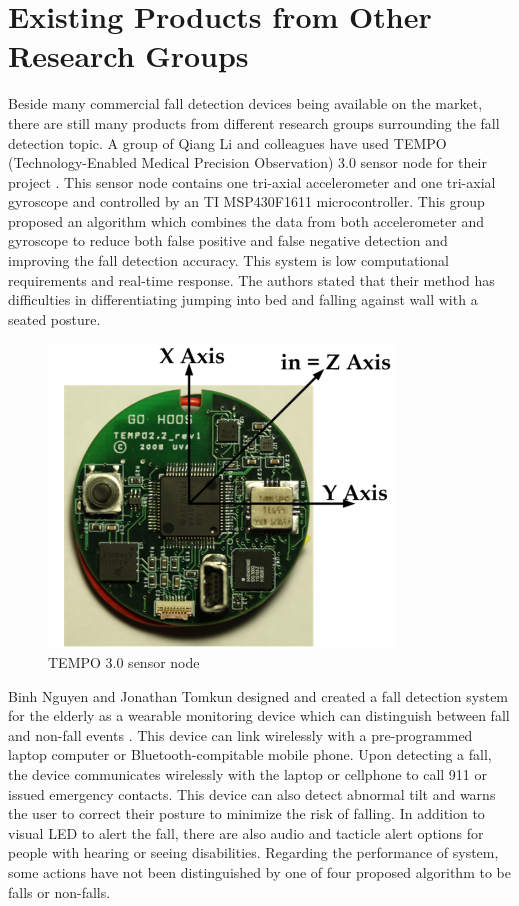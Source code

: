 \documentclass[letterpaper,12pt,titlepage,oneside,final]{book}
\begin{document}
\section{Existing Products from Other Research Groups}
Beside many commercial fall detection devices being available on the market, there are still many products from different research groups surrounding the fall detection topic. A group of Qiang Li and colleagues have used TEMPO (Technology-Enabled Medical Precision Observation) 3.0 sensor node for their project \cite{li}. This sensor node contains one tri-axial accelerometer and one tri-axial gyroscope and controlled by an TI MSP430F1611 microcontroller. This group proposed an algorithm which combines the data from both accelerometer and gyroscope to reduce both false positive and false negative detection and improving the fall detection accuracy. This system is low computational requirements and real-time response. The authors stated that their method has difficulties in differentiating jumping into bed and falling against wall with a seated posture. 

 \begin{figure}[h!]
	\centering
	\includegraphics{tempo}
	\caption{TEMPO 3.0 sensor node}
\end{figure}

Binh Nguyen and Jonathan Tomkun designed and created a fall detection system for the elderly as a wearable monitoring device which can distinguish between fall and non-fall events  \cite{binh}. This device can link wirelessly with a pre-programmed laptop computer or Bluetooth-compitable mobile phone. Upon detecting a fall, the device communicates wirelessly with the laptop or cellphone to call 911 or issued emergency contacts. This device can also detect abnormal tilt and warns the user to correct their posture to minimize the risk of falling. In addition to visual LED to alert the fall, there are also audio and tacticle alert options for people with hearing or seeing disabilities. Regarding the performance of system, some actions have not been distinguished by one of four proposed algorithm to be falls or non-falls. 
\end{document}
